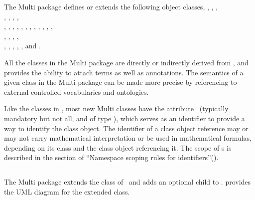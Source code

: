 The Multi package defines or extends the following object classes, \ExModel, \ListOfSpeciesTypes, \ExCompartment,\\ 
\ListOfCompartmentReferences, \CompartmentReference, \SpeciesType, \ListOfSpeciesTypeInstances, \\
\ListOfSpeciesFeatureTypes, \ListOfInSpeciesTypeBonds, \ListOfSpeciesTypeComponentIndexes, \SpeciesFeatureType,
\ListOfPossibleSpeciesFeatureValues, \PossibleSpeciesFeatureValue, \SpeciesTypeInstance, \InSpeciesTypeBond,
\SpeciesTypeComponentIndex, \ExSpecies, \ListOfOutwardBindingSites, \ListOfSpeciesFeatures, \\
\SubListOfSpeciesFeatures, \OutwardBindingSite, \SpeciesFeature, \ListOfSpeciesFeatureValues, \\
\SpeciesFeatureValue, \ExReaction, \ExSimpleSpeciesReference, \ExSpeciesReference, \ListOfSpeciesTypeComponentMapsInProduct, and  \SpeciesTypeComponentMapInProduct.  

All the classes in the Multi package are directly or indirectly derived from \SBase, and \SBase provides the ability to attach  terms as well as  annotations. The semantics of a given class in the Multi package can be made more precise by referencing to external controlled vocabularies and ontologies.

Like the classes in \SbmlLevelThreeCore, most new Multi classes have the attribute \idAtt\ (typically mandatory but not all, and of type \SIdPT), which serves as an identifier to provide a way to identify the class object. The identifier of a class object reference may or may not carry  mathematical interpretation or be used in mathematical formulas, depending on its class and the class object referencing it. The scope of \idAtt s is described in the section of ``Namespace scoping rules for identifiers''(). 

\clearpage

\subsection{\Model}
\label{def:Model}

The Multi package extends the \Model class of \SbmlLevelThreeCore\ and adds an optional \ListOfSpeciesTypes child to \ExModel.  provides the UML diagram for the extended \ExModel class.

